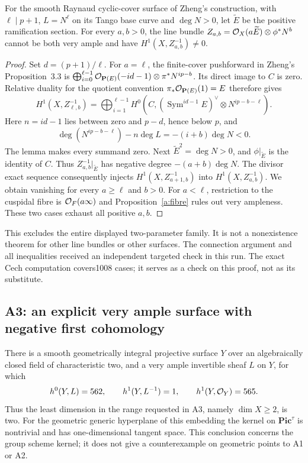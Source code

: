 \begin{proposition}[A3R; Proved]\label{a:raynaud-all}
For the smooth Raynaud cyclic-cover surface of Zheng's construction,
with $\ell\mid p+1$, $L=N^\ell$ on its Tango base curve and
$\deg N>0$, let $\widetilde E$ be the positive ramification section.
For every $a,b>0$, the line bundle
$Z_{a,b}=\mathcal O_X(a\widetilde E)\otimes\phi^*N^b$ cannot be both very
ample and have $H^1(X,Z_{a,b}^{-1})\ne0$.
\end{proposition}
\begin{proof}
Set $d=(p+1)/\ell$. For $a=\ell$, the finite-cover pushforward in
Zheng's Proposition~3.3 is
$\bigoplus_{i=0}^{\ell-1}\mathcal O_{\mathbf P(E)}(-id-1)\otimes\pi^*N^{ip-b}$.
Its direct image to $C$ is zero. Relative duality for the quotient
convention $\pi_*\mathcal O_{\mathbf P(E)}(1)=E$ therefore gives
\[
 H^1(X,Z_{\ell,b}^{-1})=
 \bigoplus_{i=1}^{\ell-1}
 H^0\!\left(C,(\operatorname{Sym}^{id-1}E)^\vee
                         \otimes N^{ip-b-\ell}\right).
\]
Here $n=id-1$ lies between zero and $p-d$, hence below $p$, and
\[
 \deg(N^{ip-b-\ell})-n\deg L=-(i+b)\deg N<0.
\]
The lemma makes every summand zero.
Next $\widetilde E^2=\deg N>0$, and $\phi|_{\widetilde E}$ is the
identity of $C$. Thus $Z_{a,b}^{-1}|_{\widetilde E}$ has negative
degree $-(a+b)\deg N$. The divisor exact sequence consequently
injects $H^1(X,Z_{a+1,b}^{-1})$ into $H^1(X,Z_{a,b}^{-1})$.
We obtain vanishing for every $a\geq\ell$ and $b>0$.
For $a<\ell$, restriction to the cuspidal fibre is
$\mathcal O_F(a\infty)$ and Proposition~\ref{a:fibre} rules out very
ampleness. These two cases exhaust all positive $a,b$.
\end{proof}

This excludes the entire displayed two-parameter family. It is not a
nonexistence theorem for other line bundles or other surfaces.
The connection argument and all inequalities received an independent
targeted check in this run. The exact Cech computation covers1008 cases;
it serves as a check on this proof, not as its substitute.

\subsection{A3: an explicit very ample surface with negative first cohomology}

\begin{theorem}[A3; Proved]\label{a:very-ample-example}
There is a smooth geometrically integral projective surface $Y$ over an
algebraically closed field of characteristic two, and a very ample
invertible sheaf $L$ on $Y$, for which
\[
 h^0(Y,L)=562,\qquad h^1(Y,L^{-1})=1,\qquad h^1(Y,\mathcal O_Y)=565.
\]
Thus the least dimension in the range requested in A3, namely
$\dim X\geq2$, is two. For the geometric generic hyperplane of this
embedding the kernel on $\mathbf{Pic}^{\tau}$ is nontrivial and has
one-dimensional tangent space. This conclusion concerns the group
scheme kernel; it does not give a counterexample on geometric points
to A1 or A2.
\end{theorem}

